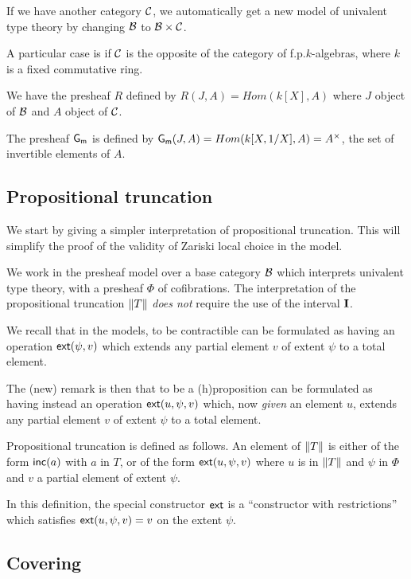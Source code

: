  If we have another category $\mathcal{C}$, we automatically get a new model of univalent type theory by
 changing $\mathcal{B}$ to $\mathcal{B}\times\mathcal{C}$.

 A particular case is if $\mathcal{C}$ is the opposite of the category of f.p.\@ $k$-algebras, where $k$ is a
 fixed commutative ring.

 We have the presheaf $R$ defined by $R(J,A) = Hom(k[X],A)$ where $J$ object of $\mathcal{B}$ and $A$ object of $\mathcal{C}$.

  The presheaf $\mathsf{G_m}$ is defined by $\mathsf{G_m}(J,A) = Hom(k[X,1/X],A) = A^{\times}$, the set of invertible elements of $A$.

\subsection{Propositional truncation}

    We start by giving a simpler interpretation of propositional truncation. This will simplify
    the proof of the validity of Zariski local choice in the model.

    We work in the presheaf model over a base category $\mathcal{B}$ which interprets univalent type theory,
    with a presheaf $\Phi$ of cofibrations. The interpretation of the propositional
    truncation $\left\lVert T \right\rVert$ {\em does not} require the use of the interval $\mathbf{I}$.

    We recall that in the models, to be contractible can be formulated as having an operation
    $\mathsf{ext}(\psi,v)$ which extends any partial element $v$ of extent $\psi$ to a total element.

    The (new) remark is then that to be a (h)proposition can be formulated as having instead
    an operation $\mathsf{ext}(u,\psi,v)$ which, now {\em given}
    an element $u$, extends any partial element $v$ of extent $\psi$ to a total element.

\medskip    

Propositional truncation is defined as follows. An element of $\left\lVert T \right\rVert$ is either of the form
$\mathsf{inc}(a)$ with $a$ in $T$, or of the form $\mathsf{ext}(u,\psi,v)$ where $u$ is in $\left\lVert T \right\rVert$ and $\psi$
in $\Phi$ and $v$ a partial element of extent $\psi$.

In this definition, the special constructor $\mathsf{ext}$ is a ``constructor with restrictions'' which
satisfies $\mathsf{ext}(u,\psi,v) = v$ on the extent $\psi$.

\subsection{Covering}

